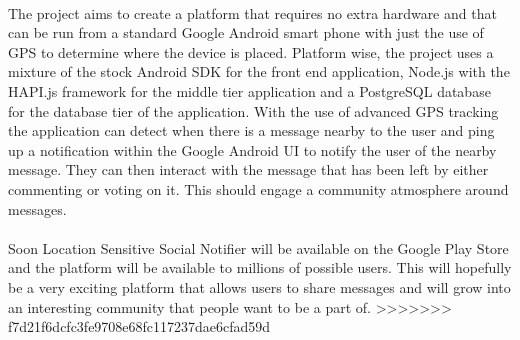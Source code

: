 \\
The project aims to create a platform that requires no extra hardware and that can be run from a standard Google Android smart phone with just the use of GPS to determine where the device is placed. Platform wise, the project uses a mixture of the stock Android SDK \cite{Google:androidAPIDocs:2015:online} for the front end application, Node.js\cite{nodeteam:node:2015:online} with the HAPI.js\cite{hapiteam:hapti:2015:online} framework for the middle tier application and a PostgreSQL\cite{Postgres:APIDocumentation:2015:online} database for the database tier of the application. With the use of advanced GPS tracking the application can detect when there is a message nearby to the user and ping up a notification within the Google Android UI to notify the user of the nearby message. They can then interact with the message that has been left by either commenting or voting on it. This should engage a community atmosphere around messages.\\ 
\\
Soon Location Sensitive Social Notifier will be available on the Google Play Store and the platform will be available to millions of possible users. This will hopefully be a very exciting platform that allows users to share messages and will grow into an interesting community that people want to be a part of.
>>>>>>> f7d21f6dcfc3fe9708e68fc117237dae6cfad59d
